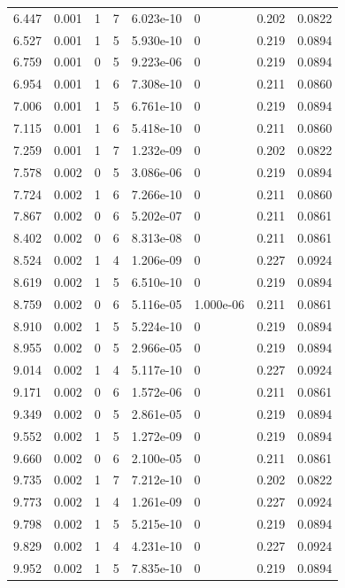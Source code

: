 \documentclass[preview]{standalone}
\begin{document}
{{\begin{tabular}{L{1.2cm}C{1.2cm} C{0.3cm}C{0.5cm} C{1.4cm}C{1.4cm} C{1.4cm}C{1.4cm}}
  6.447  &  0.001  & 1     &  7 &  6.023e-10  & 0  & 0.202 &  0.0822   \\ 
  6.527  &  0.001  & 1     &  5 &  5.930e-10  & 0  & 0.219 &  0.0894   \\ 
  6.759  &  0.001  & 0     &  5 &  9.223e-06  & 0  & 0.219 &  0.0894   \\ 
  6.954  &  0.001  & 1     &  6 &  7.308e-10  & 0  & 0.211 &  0.0860   \\ 
  7.006  &  0.001  & 1     &  5 &  6.761e-10  & 0  & 0.219 &  0.0894   \\ 
  7.115  &  0.001  & 1     &  6 &  5.418e-10  & 0  & 0.211 &  0.0860   \\ 
  7.259  &  0.001  & 1     &  7 &  1.232e-09  & 0  & 0.202 &  0.0822   \\ 
  7.578  &  0.002  & 0     &  5 &  3.086e-06  & 0  & 0.219 &  0.0894   \\ 
  7.724  &  0.002  & 1     &  6 &  7.266e-10  & 0  & 0.211 &  0.0860   \\ 
  7.867  &  0.002  & 0     &  6 &  5.202e-07  & 0  & 0.211 &  0.0861   \\ 
  8.402  &  0.002  & 0     &  6 &  8.313e-08  & 0  & 0.211 &  0.0861   \\ 
  8.524  &  0.002  & 1     &  4 &  1.206e-09  & 0  & 0.227 &  0.0924   \\ 
  8.619  &  0.002  & 1     &  5 &  6.510e-10  & 0  & 0.219 &  0.0894   \\ 
  8.759  &  0.002  & 0     &  6 &  5.116e-05  & 1.000e-06  & 0.211 &  0.0861   \\ 
  8.910  &  0.002  & 1     &  5 &  5.224e-10  & 0  & 0.219 &  0.0894   \\ 
  8.955  &  0.002  & 0     &  5 &  2.966e-05  & 0  & 0.219 &  0.0894   \\ 
  9.014  &  0.002  & 1     &  4 &  5.117e-10  & 0  & 0.227 &  0.0924   \\ 
  9.171  &  0.002  & 0     &  6 &  1.572e-06  & 0  & 0.211 &  0.0861   \\ 
  9.349  &  0.002  & 0     &  5 &  2.861e-05  & 0  & 0.219 &  0.0894   \\ 
  9.552  &  0.002  & 1     &  5 &  1.272e-09  & 0  & 0.219 &  0.0894   \\ 
  9.660  &  0.002  & 0     &  6 &  2.100e-05  & 0  & 0.211 &  0.0861   \\ 
  9.735  &  0.002  & 1     &  7 &  7.212e-10  & 0  & 0.202 &  0.0822   \\ 
  9.773  &  0.002  & 1     &  4 &  1.261e-09  & 0  & 0.227 &  0.0924   \\ 
  9.798  &  0.002  & 1     &  5 &  5.215e-10  & 0  & 0.219 &  0.0894   \\ 
  9.829  &  0.002  & 1     &  4 &  4.231e-10  & 0  & 0.227 &  0.0924   \\ 
  9.952  &  0.002  & 1     &  5 &  7.835e-10  & 0  & 0.219 &  0.0894   \\ 
\hline 
\end{tabular} 

}}
\end{document}
